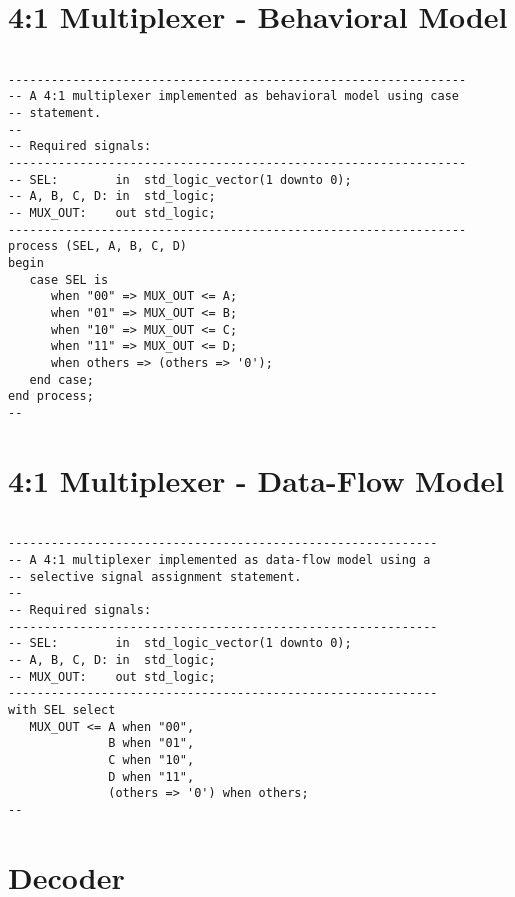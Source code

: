 \section{4:1 Multiplexer - Behavioral Model}

\noindent
\begin{minipage}{0.99\linewidth}
\begin{lstlisting}

----------------------------------------------------------------
-- A 4:1 multiplexer implemented as behavioral model using case
-- statement.
--
-- Required signals:
----------------------------------------------------------------
-- SEL:        in  std_logic_vector(1 downto 0);
-- A, B, C, D: in  std_logic;
-- MUX_OUT:    out std_logic;
----------------------------------------------------------------
process (SEL, A, B, C, D)
begin
   case SEL is
      when "00" => MUX_OUT <= A;
      when "01" => MUX_OUT <= B;
      when "10" => MUX_OUT <= C;
      when "11" => MUX_OUT <= D;
      when others => (others => '0');
   end case;
end process;
--
\end{lstlisting}
\end{minipage}

\section{4:1 Multiplexer - Data-Flow Model}

\noindent
\begin{minipage}{0.99\linewidth}
\begin{lstlisting}

------------------------------------------------------------
-- A 4:1 multiplexer implemented as data-flow model using a
-- selective signal assignment statement.
--
-- Required signals:
------------------------------------------------------------
-- SEL:        in  std_logic_vector(1 downto 0);
-- A, B, C, D: in  std_logic;
-- MUX_OUT:    out std_logic;
------------------------------------------------------------
with SEL select
   MUX_OUT <= A when "00",
              B when "01",
              C when "10",
              D when "11",
              (others => '0') when others;
--
\end{lstlisting}
\end{minipage}

\section{Decoder}


